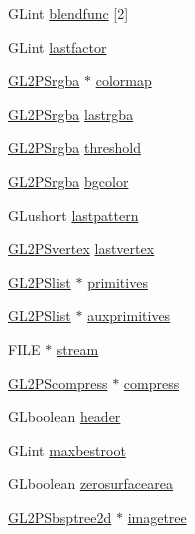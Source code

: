 \begin{DoxyCompactItemize}
\item 
G\+Lint \hyperlink{struct_g_l2_p_scontext_a625c3e3279762dd14978fe4991fee094}{blendfunc} \mbox{[}2\mbox{]}
\item 
G\+Lint \hyperlink{struct_g_l2_p_scontext_a937de827c12eef3277d291071461c6ba}{lastfactor}
\item 
\hyperlink{gl2ps_8h_a8e362d2f509289c8a074fa745816df9d}{G\+L2\+P\+Srgba} $\ast$ \hyperlink{struct_g_l2_p_scontext_ac2513a40f5f94351efff9b30afab5a73}{colormap}
\item 
\hyperlink{gl2ps_8h_a8e362d2f509289c8a074fa745816df9d}{G\+L2\+P\+Srgba} \hyperlink{struct_g_l2_p_scontext_aa8a3f3056669e972e640fcc4b3b51138}{lastrgba}
\item 
\hyperlink{gl2ps_8h_a8e362d2f509289c8a074fa745816df9d}{G\+L2\+P\+Srgba} \hyperlink{struct_g_l2_p_scontext_a54fd6f5a72a26b3f578f3526250984e2}{threshold}
\item 
\hyperlink{gl2ps_8h_a8e362d2f509289c8a074fa745816df9d}{G\+L2\+P\+Srgba} \hyperlink{struct_g_l2_p_scontext_aa6157739472bbe4ff311070e41f2b4a5}{bgcolor}
\item 
G\+Lushort \hyperlink{struct_g_l2_p_scontext_a453e553f46eff8c9ca48b134f15d43bc}{lastpattern}
\item 
\hyperlink{struct_g_l2_p_svertex}{G\+L2\+P\+Svertex} \hyperlink{struct_g_l2_p_scontext_a6f1db432d22f2fc5a3d8c7668fca1a29}{lastvertex}
\item 
\hyperlink{struct_g_l2_p_slist}{G\+L2\+P\+Slist} $\ast$ \hyperlink{struct_g_l2_p_scontext_a8f67bda6d892a406bd1af48e8717b17e}{primitives}
\item 
\hyperlink{struct_g_l2_p_slist}{G\+L2\+P\+Slist} $\ast$ \hyperlink{struct_g_l2_p_scontext_ad8b4d68371a2a6e96aa6adda339888ea}{auxprimitives}
\item 
F\+I\+L\+E $\ast$ \hyperlink{struct_g_l2_p_scontext_ad069183e2781d7d095a94d935ea333bc}{stream}
\item 
\hyperlink{struct_g_l2_p_scompress}{G\+L2\+P\+Scompress} $\ast$ \hyperlink{struct_g_l2_p_scontext_aaca54f23191e9f318f7394da342a9384}{compress}
\item 
G\+Lboolean \hyperlink{struct_g_l2_p_scontext_adaf1a843b0de36775c88f09e9814816d}{header}
\item 
G\+Lint \hyperlink{struct_g_l2_p_scontext_a0975ded6f444194578456f0b9186fbf9}{maxbestroot}
\item 
G\+Lboolean \hyperlink{struct_g_l2_p_scontext_a0c2b1ec59d2c6ecd8a12703cad451569}{zerosurfacearea}
\item 
\hyperlink{gl2ps_8c_a5b053abb28288f41261327d47a298bea}{G\+L2\+P\+Sbsptree2d} $\ast$ \hyperlink{struct_g_l2_p_scontext_ac63c39de233a26b41bfab24a543dfa6f}{imagetree}

\end{DoxyCompactItemize}
